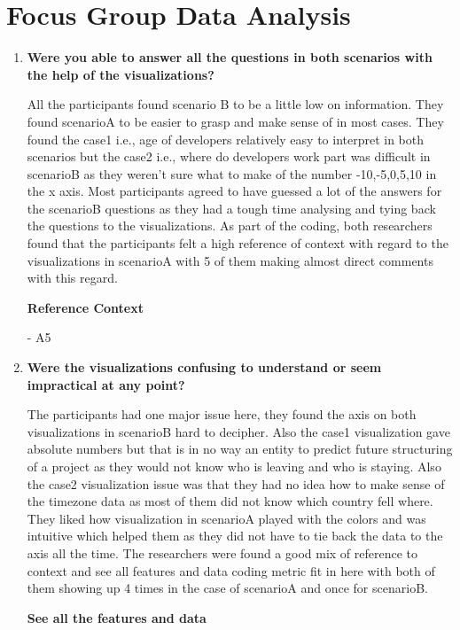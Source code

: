 \documentclass[seploa]{beavtex}
\begin{document}
\section{Focus Group Data Analysis}
\begin{enumerate}
\item \textbf{Were you able to answer all the questions in both scenarios with the help of the visualizations?}

All the participants found scenario B to be a little low on information. They found scenarioA to be easier to grasp and make sense of in most cases. They found the case1 i.e., age of developers relatively easy to interpret in both scenarios but the case2 i.e., where do developers work part was difficult in scenarioB as they weren't sure what to make of the number -10,-5,0,5,10 in the x axis. Most participants agreed to have guessed a lot of the answers for the scenarioB questions as they had a tough time analysing and tying back the questions to the visualizations.
As part of the coding, both researchers found that the participants felt a high reference of context with regard to the visualizations in scenarioA with 5 of them making almost direct comments with this regard.

\textbf{Reference Context}

{\em {}}- A5

\item \textbf{Were the visualizations confusing to understand or seem impractical at any point?}

The participants had one major issue here, they found the axis on both visualizations in scenarioB hard to decipher. Also the case1 visualization gave absolute numbers but that is in no way an entity to predict future structuring of a project as they would not know who is leaving and who is staying. Also the case2 visualization issue was that they had no idea how to make sense of the timezone data as most of them did not know which country fell where. They liked how visualization in scenarioA played with the colors and was intuitive which helped them as they did not have to tie back the data to the axis all the time. The researchers were found a good mix of reference to context and see all features and data coding metric fit in here with both of them showing up 4 times in the case of scenarioA and once for scenarioB.

\textbf{See all the features and data}


\end{enumerate}
\end{document}
